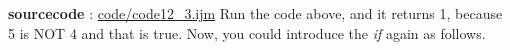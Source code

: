 \textbf{sourcecode} : \href{http://www.example.com/contents}{code/code12\_3.ijm}
Run the code above, and it returns 1, because 5 is NOT 4 and that is true. Now,
you could introduce the \textit{if} again as follows.